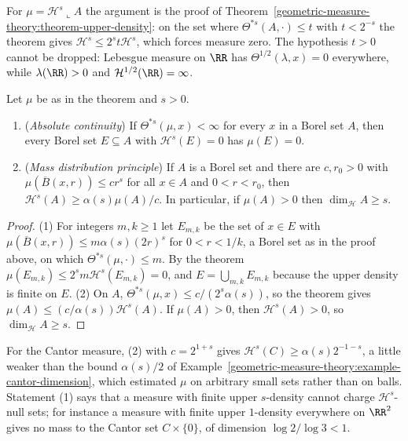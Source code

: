 For $\mu = \mathcal{H}^s\llcorner A$ the argument is the proof of Theorem~\ref{geometric-measure-theory:theorem-upper-density}: on the set where $\Theta^{*s}(A, \cdot) \leq t$ with $t < 2^{-s}$ the theorem
gives $\mathcal{H}^s \leq 2^st\mathcal{H}^s$, which forces measure zero. The hypothesis $t > 0$ cannot be dropped: Lebesgue measure on $\RR$ has $\Theta^{1/2}(\lambda, x) = 0$ everywhere, while
$\lambda(\RR) > 0$ and $\mathcal{H}^{1/2}(\RR) = \infty$.

\begin{corollary}\label{geometric-measure-theory:corollary-density-consequences}
Let $\mu$ be as in the theorem and $s > 0$.
\begin{enumerate}
\item (\emph{Absolute continuity}) If $\Theta^{*s}(\mu, x) < \infty$ for every $x$ in a Borel set $A$, then every Borel set $E \subseteq A$ with $\mathcal{H}^s(E) = 0$ has $\mu(E) = 0$.
\item (\emph{Mass distribution principle}) If $A$ is a Borel set and there are $c, r_0 > 0$ with $\mu(\overline{B}(x, r)) \leq cr^s$ for all $x \in A$ and $0 < r < r_0$, then
$\mathcal{H}^s(A) \geq \alpha(s)\mu(A)/c$. In particular, if $\mu(A) > 0$ then $\dim_{\mathcal{H}}A \geq s$.
\end{enumerate}
\end{corollary}

\begin{proof}
(1) For integers $m, k \geq 1$ let $E_{m,k}$ be the set of $x \in E$ with $\mu(\overline{B}(x, r)) \leq m\alpha(s)(2r)^s$ for $0 < r < 1/k$, a Borel set as in the proof above, on which
$\Theta^{*s}(\mu, \cdot) \leq m$. By the theorem $\mu(E_{m,k}) \leq 2^sm\mathcal{H}^s(E_{m,k}) = 0$, and $E = \bigcup_{m,k}E_{m,k}$ because the upper density is finite on $E$.
(2) On $A$, $\Theta^{*s}(\mu, x) \leq c/(2^s\alpha(s))$, so the theorem gives $\mu(A) \leq (c/\alpha(s))\mathcal{H}^s(A)$. If $\mu(A) > 0$, then $\mathcal{H}^s(A) > 0$, so $\dim_{\mathcal{H}}A \geq s$.
\end{proof}

For the Cantor measure, (2) with $c = 2^{1+s}$ gives $\mathcal{H}^s(C) \geq \alpha(s)2^{-1-s}$, a little weaker than the bound $\alpha(s)/2$ of Example~\ref{geometric-measure-theory:example-cantor-dimension}, which
estimated $\mu$ on arbitrary small sets rather than on balls. Statement (1) says that a measure with finite upper $s$-density cannot charge $\mathcal{H}^s$-null sets; for instance a measure with finite
upper $1$-density everywhere on $\RR^2$ gives no mass to the Cantor set $C \times \{0\}$, of dimension $\log 2/\log 3 < 1$.

